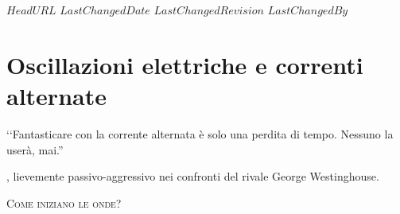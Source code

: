\svnidlong
{$HeadURL$}
{$LastChangedDate$}
{$LastChangedRevision$}
{$LastChangedBy$}

\chapter{Oscillazioni elettriche e correnti alternate}
\begin{introduction}
	‘‘Fantasticare con la corrente alternata è solo una perdita di tempo. Nessuno la userà, mai.''
	\begin{flushright}
		, lievemente passivo-aggressivo nei confronti del rivale George Westinghouse.
	\end{flushright}
\end{introduction}
\lettrine[findent=1pt, nindent=0pt]{C}{ome iniziano le onde?} 

